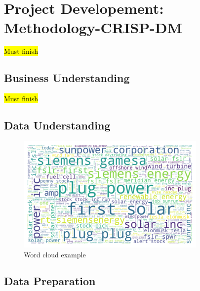 \documentclass[sigconf, nonacm]{acmart}
\begin{document}
\section{Project Developement: Methodology-CRISP-DM}
\hl{Must finish}


\subsection{Business Understanding}
\hl{Must finish}

\subsection{Data Understanding}
\begin{figure}[H]
  \centering
  \includegraphics[width=\linewidth]{word_cloud_example.png}
  \caption{Word cloud example}
\end{figure}

\subsection{Data Preparation}


\end{document}
